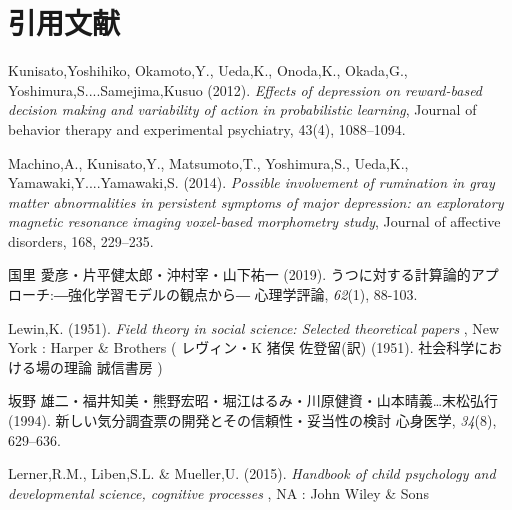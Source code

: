 \hypertarget{ux5f15ux7528ux6587ux732e}{%
    \section{引用文献}\label{ux5f15ux7528ux6587ux732e}}
\hypertarget{refs}{}
    \leavevmode\hypertarget{ref-Kunisato2012}{}%
Kunisato,Yoshihiko, Okamoto,Y., Ueda,K., Onoda,K., Okada,G., Yoshimura,S....Samejima,Kusuo (2012). \emph{Effects of depression on reward-based decision making and variability of action in probabilistic learning}, Journal of behavior therapy and experimental psychiatry, 43(4), 1088--1094.


\hypertarget{refs}{}
    \leavevmode\hypertarget{ref-Machino2014}{}%
Machino,A., Kunisato,Y., Matsumoto,T., Yoshimura,S., Ueda,K., Yamawaki,Y....Yamawaki,S. (2014). \emph{Possible involvement of rumination in gray matter abnormalities in persistent symptoms of major depression: an exploratory magnetic resonance imaging voxel-based morphometry study}, Journal of affective disorders, 168, 229--235.


\hypertarget{refs}{}
    \leavevmode\hypertarget{ref-kunisato2019}{}%
国里 愛彦・片平健太郎・沖村宰・山下祐一 (2019). うつに対する計算論的アプローチ:―強化学習モデルの観点から― 心理学評論, \emph{62}(1), 88-103.


\hypertarget{refs}{}
    \leavevmode\hypertarget{ref-Lewin}{}%
Lewin,K. (1951). \emph{Field theory in social science: Selected theoretical papers} , New York : Harper \& Brothers ( レヴィン・K 猪俣 佐登留(訳) (1951). 社会科学における場の理論 誠信書房 )


\hypertarget{refs}{}
    \leavevmode\hypertarget{ref-ux5742ux91ceux96c4ux4e8c1994}{}%
坂野 雄二・福井知美・熊野宏昭・堀江はるみ・川原健資・山本晴義…末松弘行 (1994). 新しい気分調査票の開発とその信頼性・妥当性の検討 心身医学, \emph{34}(8), 629--636.


\hypertarget{refs}{}
    \leavevmode\hypertarget{ref-lerner2015handbook}{}%
Lerner,R.M., Liben,S.L. \& Mueller,U. (2015). \emph{Handbook of child psychology and developmental science, cognitive processes} , NA : John Wiley \& Sons


